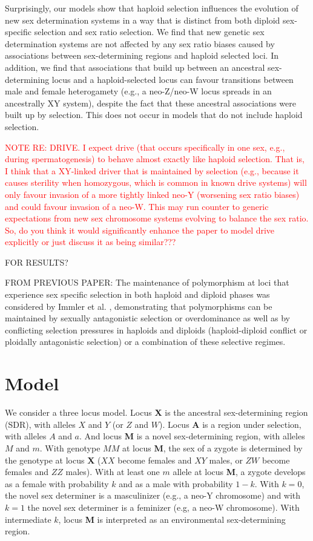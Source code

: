 \documentclass[12pt]{article}
\begin{document}
Surprisingly, our models show that haploid selection influences the evolution of new sex determination systems in a way that is distinct from both diploid sex-specific selection and sex ratio selection. 
We find that new genetic sex determination systems are not affected by any sex ratio biases caused by associations between sex-determining regions and haploid selected loci. 
In addition, we find that associations that build up between an ancestral sex-determining locus and a haploid-selected locus can favour transitions between male and female heterogamety (e.g., a neo-Z/neo-W locus spreads in an ancestrally XY system), despite the fact that these ancestral associations were built up by selection. 
This does not occur in models that do not include haploid selection. 



\textcolor{red}{NOTE RE: DRIVE. I expect drive (that occurs specifically in one sex, e.g., during spermatogenesis) to behave almost exactly like haploid selection. That is, I think that a XY-linked driver that is maintained by selection (e.g., because it causes sterility when homozygous, which is common in known drive systems) will only favour invasion of a more tightly linked neo-Y (worsening sex ratio biases) and could favour invasion of a neo-W. This may run counter to generic expectations from new sex chromosome systems evolving to balance the sex ratio. So, do you think it would significantly enhance the paper to model drive explicitly or just discuss it as being similar???}

{\color{blue} 
FOR RESULTS?

FROM PREVIOUS PAPER:
The maintenance of polymorphism at loci that experience sex specific selection in both haploid and diploid phases was considered by Immler et al. \cite{Immler:2012tl}, demonstrating that polymorphisms can be maintained by sexually antagonistic selection or overdominance as well as by conflicting selection pressures in haploids and diploids (haploid-diploid conflict or ploidally antagonistic selection) or a combination of these selective regimes.  
}


\section*{Model}

We consider a three locus model.
Locus \textbf{X} is the ancestral sex-determining region (SDR), with alleles $X$ and $Y$ (or $Z$ and $W$).
Locus \textbf{A} is a region under selection, with alleles $A$ and $a$.
And locus \textbf{M} is a novel sex-determining region, with alleles $M$ and $m$.
With genotype $MM$ at locus \textbf{M}, the sex of a zygote is determined by the genotype at locus \textbf{X} ($XX$ become females and $XY$ males, or $ZW$ become females and $ZZ$ males).
With at least one $m$ allele at locus \textbf{M}, a zygote develops as a female with probability $k$ and as a male with probability $1-k$.
With $k=0$, the novel sex determiner is a masculinizer (e.g., a neo-Y chromosome) and with $k=1$ the novel sex determiner is a feminizer (e.g, a neo-W chromosome).
With intermediate $k$, locus \textbf{M} is interpreted as an environmental sex-determining region.
\end{document}
